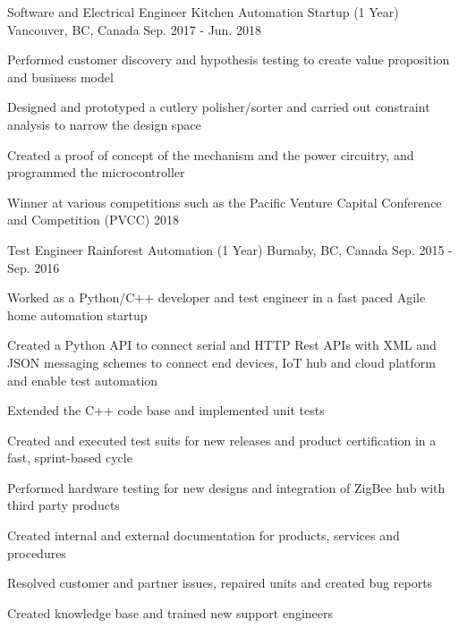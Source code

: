 \begin{cventries}
  \cventry
    {Software and Electrical Engineer} %
    {Kitchen Automation Startup (1 Year)} %
    {Vancouver, BC, Canada} %
    {Sep. 2017 - Jun. 2018} %
    {
      \begin{cvitems} %
        \item {Performed customer discovery and hypothesis testing to create value proposition and business model}
        \item {Designed and prototyped a cutlery polisher/sorter and carried out constraint analysis to narrow the design space}
        \item {Created a proof of concept of the mechanism and the power circuitry, and programmed the microcontroller}
        \item {Winner at various competitions such as the Pacific Venture Capital Conference and Competition (PVCC) 2018}
      \end{cvitems}
    }


  \cventry
    {Test Engineer} %
    {Rainforest Automation (1 Year)} %
    {Burnaby, BC, Canada} %
    {Sep. 2015 - Sep. 2016} %
    {
	  \begin{cvitems} %
		\item {Worked as a Python/C++ developer and test engineer in a fast paced Agile home automation startup}
        \item {Created a Python API to connect serial and HTTP Rest APIs with XML and JSON messaging schemes to connect end devices, IoT hub and cloud platform and enable test automation}
        \item {Extended the C++ code base and implemented unit tests}
        \item {Created and executed test suits for new releases and product certification in a fast, sprint-based cycle}
        \item {Performed hardware testing for new designs and integration of ZigBee hub with third party products}
        \item {Created internal and external documentation for products, services and procedures}
        \item {Resolved customer and partner issues, repaired units and created bug reports}
        \item {Created knowledge base and trained new support engineers}
      \end{cvitems}
    }



\end{cventries}
